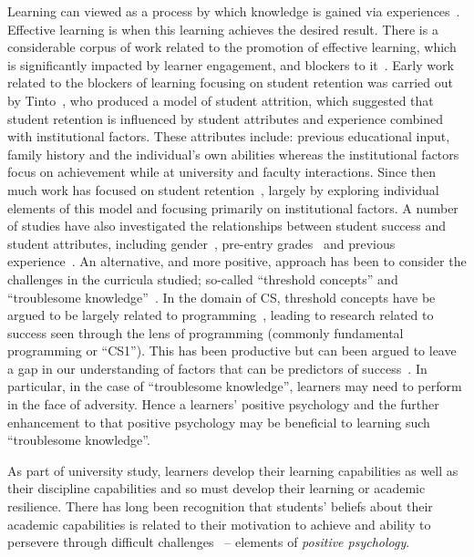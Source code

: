 \documentclass[sigconf]{acmart}
\begin{document}
Learning can viewed as a process by which knowledge is gained via experiences~\cite{kolb2014}. Effective learning is when this learning achieves the desired result. There is a considerable corpus of work related to the promotion of effective learning, which is significantly impacted by learner engagement, and blockers to it~\cite{kolb2014}. Early work related to the blockers of learning focusing on student retention was carried out by Tinto~\cite{Tinto1975}, who produced a model of student attrition, which suggested that student retention is influenced by student attributes and experience combined with institutional factors. These attributes include: previous educational input, family history and the individual's own abilities whereas the institutional factors focus on achievement while at university and faculty interactions. Since then much work has focused on student retention~\cite{Barbera2017,Chen2012}, largely by exploring individual elements of this model and focusing primarily on institutional factors. A number of studies have also investigated the relationships between student success and student attributes, including gender~\cite{Lishinski:2016:LPG:2960310.2960329}, pre-entry grades~\cite{Peterson1979} and previous experience~\cite{Ramalingam:2004:SMM:1026487.1008042}. An alternative, and more positive, approach has been to consider the challenges in the curricula studied; so-called ``threshold concepts'' and ``troublesome knowledge''~\cite{Land2012}. In the domain of CS, threshold concepts have be argued to be largely related to programming~\cite{Sanders:2016:TCC:2999541.2999546}, leading to research related to success seen through the lens of programming (commonly fundamental programming or ``CS1''). This has been productive but can been argued to leave a gap in our understanding of factors that can be predictors of success~\cite{Liao:2019:EVD:3287324.3287407,Liao:2016:LEI:2960310.2960315,Castro-Wunsch:2017:ENN:3017680.3017792,Quille:2018:PPS:3197091.3197101}. In particular, in the case of ``troublesome knowledge'', learners may need to perform in the face of adversity. Hence a learners' positive psychology and the further enhancement to that positive psychology may be beneficial to learning such ``troublesome knowledge''.

As part of university study, learners develop their learning capabilities as well as their discipline capabilities and so must develop their learning or academic resilience.  There has long been recognition that students' beliefs about their academic capabilities is related to their motivation to achieve and ability to persevere through difficult challenges~\cite{ZIMMERMAN200082,Bandura1977} -- elements of {\em positive psychology}.
 
\end{document}
